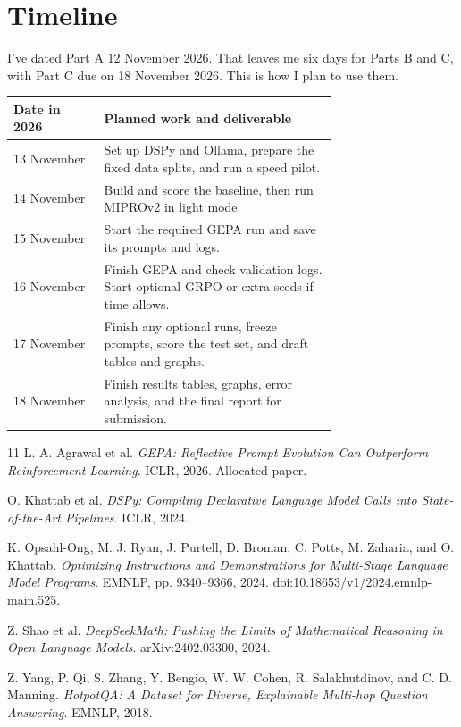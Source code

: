 \documentclass[11pt,a4paper]{article}
\begin{document}
{{{\section{Timeline}
I've dated Part A 12 November 2026. That leaves me six days for Parts B
and C, with Part C due on 18 November 2026. This is how I plan to use them.
\begin{center}
\begin{tabular}{lp{0.72\linewidth}}
\hline
Date in 2026 & Planned work and deliverable \\ \hline
13 November & Set up DSPy and Ollama, prepare the fixed data splits, and run a speed pilot. \\
14 November & Build and score the baseline, then run MIPROv2 in light mode. \\
15 November & Start the required GEPA run and save its prompts and logs. \\
16 November & Finish GEPA and check validation logs. Start optional GRPO or extra seeds if time allows. \\
17 November & Finish any optional runs, freeze prompts, score the test set, and draft tables and graphs. \\
18 November & Finish results tables, graphs, error analysis, and the final report for submission. \\ \hline
\end{tabular}
\end{center}

\begin{thebibliography}{11}
\small
\setlength{\itemsep}{2pt}
 L. A. Agrawal et al.
\textit{GEPA: Reflective Prompt Evolution Can Outperform Reinforcement Learning}.
ICLR, 2026. Allocated paper.

 O. Khattab et al.
\textit{DSPy: Compiling Declarative Language Model Calls into State-of-the-Art
Pipelines}. ICLR, 2024.

 K. Opsahl-Ong, M. J. Ryan, J. Purtell, D. Broman, C. Potts,
M. Zaharia, and O. Khattab.
\textit{Optimizing Instructions and Demonstrations for Multi-Stage Language
Model Programs}. EMNLP, pp. 9340--9366, 2024.
doi:10.18653/v1/2024.emnlp-main.525.

 Z. Shao et al.
\textit{DeepSeekMath: Pushing the Limits of Mathematical Reasoning in Open
Language Models}. arXiv:2402.03300, 2024.

 Z. Yang, P. Qi, S. Zhang, Y. Bengio, W. W. Cohen,
R. Salakhutdinov, and C. D. Manning.
\textit{HotpotQA: A Dataset for Diverse, Explainable Multi-hop Question Answering}.
EMNLP, 2018.


\end{thebibliography}}}}
\end{document}
